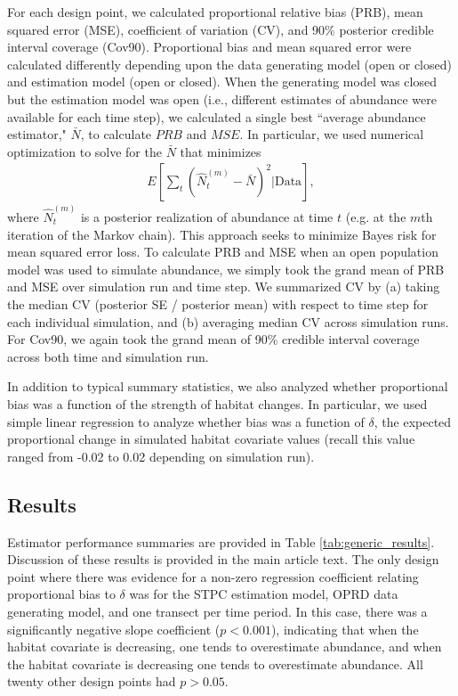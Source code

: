 \documentclass[12pt,fleqn]{article}
\begin{document}
\begin{flushleft}
\hspace{.5in} For each design point, we calculated proportional relative bias (PRB), mean squared error (MSE), coefficient of variation (CV), and 90\% posterior credible interval coverage (Cov90).  Proportional bias and mean squared error were calculated differently depending upon the data generating model (open or closed) and estimation model (open or closed).  When the generating model was closed but the estimation model was open (i.e., different estimates of abundance were available for each time step), we calculated a single best ``average abundance estimator," $\bar{N}$, to calculate $PRB$ and $MSE$.  In particular, we used numerical optimization \citep[via the `BFGS' minimizer in function \texttt{optim} in the R programming environment][]{RTeam2012} to solve for the $\bar{N}$ that minimizes
\begin{eqnarray*}
  E \left[ \sum_t (\hat{N}_t^{(m)} - \bar{N})^2 | \text{Data} \right],
\end{eqnarray*}
where $\hat{N}_t^{(m)}$ is a posterior realization of abundance at time $t$ (e.g. at the $m$th iteration of the Markov chain).  This approach seeks to minimize Bayes risk for mean squared error loss. To calculate PRB and MSE when an open population model was used to simulate abundance, we simply took the grand mean of PRB and MSE over simulation run and time step.  We summarized CV by (a) taking the median CV (posterior SE / posterior mean) with respect to time step for each individual simulation, and (b) averaging median CV across simulation runs.  For Cov90, we again took the grand mean of 90\% credible interval coverage across both time and simulation run.

\hspace{.5in} In addition to typical summary statistics, we also analyzed whether proportional bias was a function of the strength of habitat changes.  In particular, we used simple linear regression to analyze whether bias was a function of $\delta$, the expected proportional change in simulated habitat covariate values (recall this value ranged from -0.02 to 0.02 depending on simulation run).

\subsection{Results}


Estimator performance summaries are provided in Table \ref{tab:generic_results}.  Discussion of these results is provided in the main article text.  The only design point where there was evidence for a non-zero regression coefficient relating proportional bias to $\delta$ was for the STPC estimation model, OPRD data generating model, and one transect per time period. In this case, there was a significantly negative slope coefficient ($p<0.001$), indicating that when the habitat covariate is decreasing, one tends to overestimate abundance, and when the habitat covariate is decreasing one tends to overestimate abundance.  All twenty other design points had $p>0.05$.





\end{flushleft}
\end{document}

